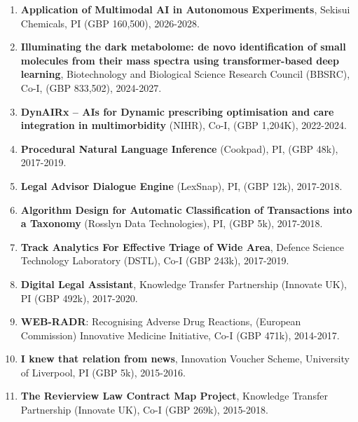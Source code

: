 \documentclass[a4paper,11pt]{article}
\begin{document}
\begin{enumerate}

\item \textbf{Application of Multimodal AI in Autonomous Experiments}, Sekisui Chemicals, PI (GBP 160,500), 2026-2028.

\item \textbf{Illuminating the dark metabolome: de novo identification of small molecules from their mass spectra using transformer-based deep learning}, Biotechnology and Biological Science Research Council (BBSRC), Co-I, (GBP 833,502), 2024-2027.

\item \textbf{DynAIRx -- AIs for Dynamic prescribing optimisation and care integration in multimorbidity} (NIHR), Co-I, (GBP 1,204K), 2022-2024.

\item \textbf{Procedural Natural Language Inference} (Cookpad), PI, (GBP 48k), 2017-2019.

\item \textbf{Legal Advisor Dialogue Engine} (LexSnap), PI, (GBP 12k), 2017-2018.

\item \textbf{Algorithm Design for Automatic Classification of Transactions into a Taxonomy} (Rosslyn Data Technologies), PI, (GBP 5k), 2017-2018.


\item \textbf{Track Analytics For Effective Triage of Wide Area}, Defence Science Technology Laboratory (DSTL), Co-I (GBP 243k), 2017-2019.

\item \textbf{Digital Legal Assistant}, Knowledge Transfer Partnership (Innovate UK), PI (GBP 492k), 2017-2020.

\item \textbf{WEB-RADR}: Recognising Adverse Drug Reactions, (European Commission) Innovative Medicine Initiative, Co-I (GBP 471k), 2014-2017.

\item \textbf{I knew that relation from news}, Innovation Voucher Scheme, University of Liverpool, PI (GBP 5k), 2015-2016.

\item \textbf{The Revierview Law Contract Map Project}, Knowledge Transfer Partnership (Innovate UK), Co-I (GBP 269k), 2015-2018.


\end{enumerate}
\end{document}
